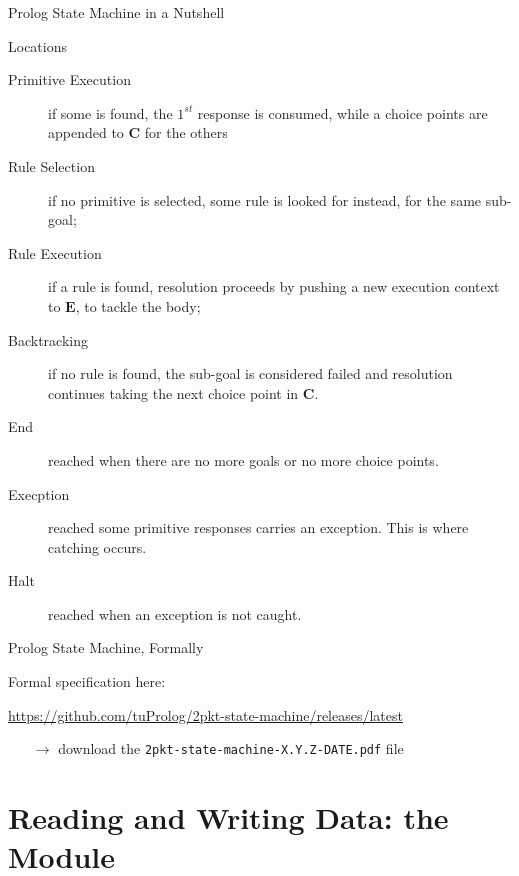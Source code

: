 \documentclass[handout]{beamer}
\begin{document}
\begin{frame}[allowframebreaks]{Prolog State Machine in a Nutshell}
\begin{block}{Locations}
\begin{description}
            \item[Primitive Execution] if some is found, the $1^{st}$ response is consumed, while a choice points are appended to $\mathbf{C}$ for the others
        
            \item[Rule Selection] if no primitive is selected, some rule is looked for instead, for the same sub-goal;
            
            \item[Rule Execution] if a rule is found, resolution proceeds by pushing a new execution context to $\mathbf{E}$, to tackle the body;
            
            \item[Backtracking] if no rule is found, the sub-goal is considered failed and resolution continues taking the next choice point in $\mathbf{C}$.
            
            \item[End] reached when there are no more goals or no more choice points.
            
            \item[Execption] reached some primitive responses carries an exception. This is where catching occurs.
            
            \item[Halt] reached when an exception is not caught.  
        \end{description}
    \end{block}
\end{frame}

\begin{frame}{Prolog State Machine, Formally}
    \begin{alertblock}{Formal specification here:}\small
        \begin{center}
            \url{https://github.com/tuProlog/2pkt-state-machine/releases/latest}
        \end{center}
        \begin{itemize}
            \item[$\rightarrow$] download the \texttt{2pkt-state-machine-X.Y.Z-DATE.pdf} file
        \end{itemize}
    \end{alertblock}
\end{frame}

\section{Reading and Writing Data: the  Module}
\end{document}
